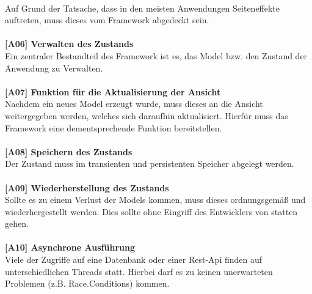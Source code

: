 \\
Auf Grund der Tatsache, dass in den meisten Anwendungen Seiteneffekte auftreten, muss dieses vom Framework abgedeckt sein.
\\
\\
\textbf{[A06] Verwalten des Zustands}
\\
Ein zentraler Bestandteil des Framework ist es, das Model bzw. den Zustand der Anwendung zu Verwalten. 
\\
\\
\textbf{[A07] Funktion für die Aktualisierung der Ansicht}
\\
Nachdem ein neues Model erzeugt wurde, muss dieses an die Ansicht weitergegeben werden, welches sich daraufhin aktualisiert. Hierfür muss das Framework eine dementsprechende Funktion bereitstellen.
\\
\\
\textbf{[A08] Speichern des Zustands}
\\
Der Zustand muss im transienten und persistenten Speicher abgelegt werden.
\\
\\
\textbf{[A09] Wiederherstellung des Zustands}
\\
Sollte es zu einem Verlust der Models kommen, muss dieses ordnungsgemäß und wiederhergestellt werden.
Dies sollte ohne Eingriff des Entwicklers von statten gehen.
\\
\\
\textbf{[A10] Asynchrone Ausführung}
\\
Viele der Zugriffe auf eine Datenbank oder einer Rest-Api finden auf unterschiedlichen Threads statt.
Hierbei darf es zu keinen unerwarteten Problemen (z.B. Race.Conditions) kommen.
\\
\\
